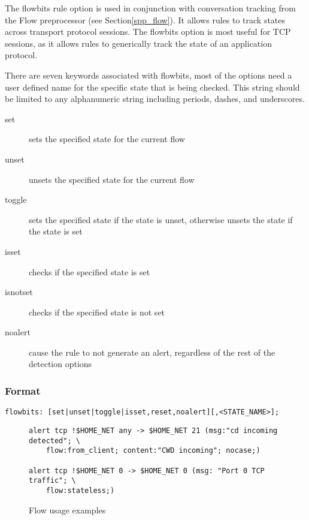 \documentclass[english]{report}
\begin{document}
The flowbits rule option is used in conjunction with conversation tracking from the Flow preprocessor (see Section\ref{spp_flow}).  It allows rules to track states across transport protocol sessions.  The flowbits option is most useful for TCP sessions, as it allows rules to generically track the state of an application protocol.

There are seven keywords associated with flowbits, most of the options need a
user defined name for the specific state that is being checked.  This string
should be limited to any alphanumeric string including periods, dashes, and
underscores.

\begin{description}
\item [set] sets the specified state for the current flow
\item [unset] unsets the specified state for the current flow
\item [toggle] sets the specified state if the state is unset, otherwise unsets the state if the state is set
\item [isset] checks if the specified state is set
\item [isnotset] checks if the specified state is not set
\item [noalert] cause the rule to not generate an alert, regardless of the rest of the detection options
\end{description}

\subsubsection{Format}

\begin{verbatim}
flowbits: [set|unset|toggle|isset,reset,noalert][,<STATE_NAME>];
\end{verbatim}




\begin{figure}[!hbpt]
\begin{verbatim}
alert tcp !$HOME_NET any -> $HOME_NET 21 (msg:"cd incoming detected"; \
    flow:from_client; content:"CWD incoming"; nocase;)

alert tcp !$HOME_NET 0 -> $HOME_NET 0 (msg: "Port 0 TCP traffic"; \
    flow:stateless;)
\end{verbatim}

\caption{Flow usage examples\label{flow usage examples}}
\end{figure}
\end{document}
